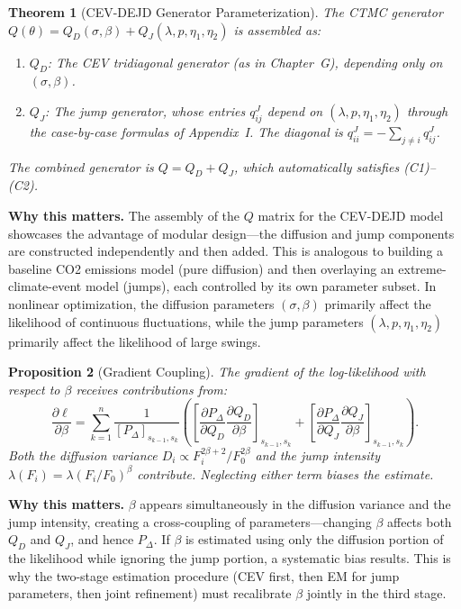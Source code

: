 \documentclass[11pt,a4paper,openany]{book}
\theoremstyle{definition}
\theoremstyle{plain}
\newtheorem{theorem}{Theorem}[chapter]
\newtheorem{proposition}[theorem]{Proposition}
\theoremstyle{remark}
\newcommand{\1}{\mathbbm{1}}
\begin{document}
\begin{theorem}[CEV-DEJD Generator Parameterization]
The CTMC generator $Q(\theta) = Q_{D}(\sigma, \beta) + Q_{J}(\lambda, p, \eta_{1}, \eta_{2})$ is assembled as:
\begin{enumerate}[label=(\arabic*)]
    \item $Q_{D}$: The CEV tridiagonal generator (as in Chapter~G), depending only on $(\sigma, \beta)$.
    \item $Q_{J}$: The jump generator, whose entries $q_{ij}^{J}$ depend on $(\lambda, p, \eta_{1}, \eta_{2})$ through the case-by-case formulas of Appendix~I. The diagonal is $q_{ii}^{J} = -\sum_{j \neq i} q_{ij}^{J}$.
\end{enumerate}
The combined generator is $Q = Q_{D} + Q_{J}$, which automatically satisfies (C1)--(C2).
\end{theorem}

\medskip
\noindent\textbf{Why this matters.} The assembly of the $Q$ matrix for the CEV-DEJD model showcases the advantage of modular design---the diffusion and jump components are constructed independently and then added. This is analogous to building a baseline CO2 emissions model (pure diffusion) and then overlaying an extreme-climate-event model (jumps), each controlled by its own parameter subset. In nonlinear optimization, the diffusion parameters $(\sigma,\beta)$ primarily affect the likelihood of continuous fluctuations, while the jump parameters $(\lambda,p,\eta_1,\eta_2)$ primarily affect the likelihood of large swings.

\begin{proposition}[Gradient Coupling]
The gradient of the log-likelihood with respect to $\beta$ receives contributions from:
\[
\frac{\partial \ell}{\partial \beta} = \sum_{k=1}^{n} \frac{1}{[P_{\Delta}]_{s_{k-1}, s_{k}}} \left( \left[\frac{\partial P_{\Delta}}{\partial Q_{D}} \frac{\partial Q_{D}}{\partial \beta}\right]_{s_{k-1}, s_{k}} + \left[\frac{\partial P_{\Delta}}{\partial Q_{J}} \frac{\partial Q_{J}}{\partial \beta}\right]_{s_{k-1}, s_{k}} \right).
\]
Both the diffusion variance $D_{i} \propto F_{i}^{2\beta+2} / F_{0}^{2\beta}$ and the jump intensity $\lambda(F_{i}) = \lambda (F_{i}/F_{0})^{\beta}$ contribute. Neglecting either term biases the estimate.
\end{proposition}

\medskip
\noindent\textbf{Why this matters.} $\beta$ appears simultaneously in the diffusion variance and the jump intensity, creating a cross-coupling of parameters---changing $\beta$ affects both $Q_D$ and $Q_J$, and hence $P_\Delta$. If $\beta$ is estimated using only the diffusion portion of the likelihood while ignoring the jump portion, a systematic bias results. This is why the two-stage estimation procedure (CEV first, then EM for jump parameters, then joint refinement) must recalibrate $\beta$ jointly in the third stage.
\end{document}
